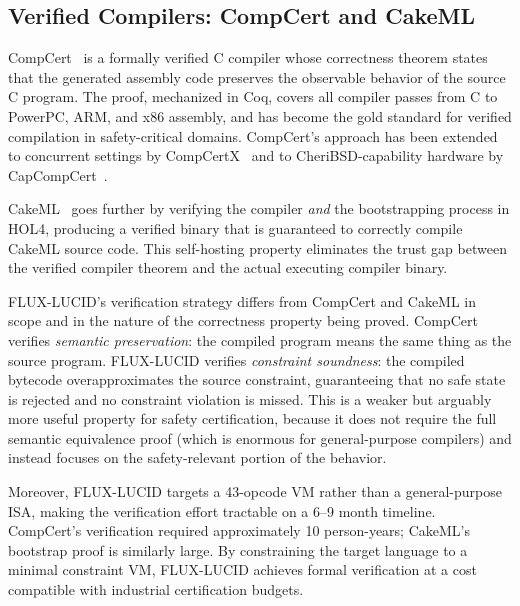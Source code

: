 \documentclass[conference]{IEEEtran}
\begin{document}
\subsection{Verified Compilers: CompCert and CakeML}
\label{sec:related-compilers}

CompCert~\cite{leroy2009compcert} is a formally verified C compiler whose
correctness theorem states that the generated assembly code preserves the
observable behavior of the source C program. The proof, mechanized in Coq,
covers all compiler passes from C to PowerPC, ARM, and x86 assembly, and
has become the gold standard for verified compilation in safety-critical
domains. CompCert's approach has been extended to concurrent settings by
CompCertX~\cite{song2019compcertx} and to CheriBSD-capability hardware by
CapCompCert~\cite{sammler2023capcompcert}.

CakeML~\cite{kumar2014cakeml} goes further by verifying the compiler
\emph{and} the bootstrapping process in HOL4, producing a verified binary
that is guaranteed to correctly compile CakeML source code. This
self-hosting property eliminates the trust gap between the verified
compiler theorem and the actual executing compiler binary.

FLUX-LUCID's verification strategy differs from CompCert and CakeML in
scope and in the nature of the correctness property being proved.
CompCert verifies \emph{semantic preservation}: the compiled program means
the same thing as the source program. FLUX-LUCID verifies \emph{constraint
soundness}: the compiled bytecode overapproximates the source constraint,
guaranteeing that no safe state is rejected and no constraint violation is
missed. This is a weaker but arguably more useful property for safety
certification, because it does not require the full semantic equivalence
proof (which is enormous for general-purpose compilers) and instead focuses
on the safety-relevant portion of the behavior.

Moreover, FLUX-LUCID targets a 43-opcode VM rather than a general-purpose
ISA, making the verification effort tractable on a 6--9 month timeline.
CompCert's verification required approximately 10 person-years; CakeML's
bootstrap proof is similarly large. By constraining the target language to a
minimal constraint VM, FLUX-LUCID achieves formal verification at a cost
compatible with industrial certification budgets.

\end{document}
